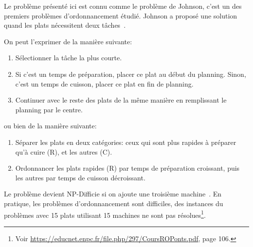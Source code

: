 \documentclass[a4paper]{article}
\begin{document}
Le problème présenté ici est connu comme le problème de Johnson, c'est un des premiers problèmes d'ordonnancement étudié. Johnson a proposé une solution quand les plats nécessitent deux tâches~\cite{johnson1954optimal}.

On peut l'exprimer de la manière suivante:
\begin{enumerate}
\item Sélectionner la tâche la plus courte.
\item Si c'est un temps de préparation, placer ce plat au début du planning. Sinon, c'est un temps de cuisson, placer ce plat en fin de planning.
\item Continuer avec le reste des plats de la même manière en remplissant le planning par le centre.
\end{enumerate}

ou bien de la manière suivante:
\begin{enumerate}
\item Séparer les plats en deux catégories: ceux qui sont plus rapides à préparer qu'à cuire (R), et les autres (C).
\item Ordonnancer les plats rapides (R) par temps de préparation croissant, puis les autres par temps de cuisson décroissant. 
\end{enumerate}

%
%


Le problème devient NP-Difficie si on ajoute une troisième machine~\cite{baker2013principles}. En pratique, les problèmes d'ordonnancement sont difficiles, des instances du problèmes avec 15 plats utilisant 15 machines ne sont pas résolues\footnote{Voir \url{https://educnet.enpc.fr/file.php/297/CoursROPonts.pdf}, page 106.}.
\end{document}

